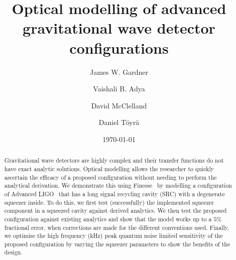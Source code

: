 \documentclass[aps,pra,superscriptaddress,reprint,nofootinbib]{revtex4-1}
\begin{document}
\title{Optical modelling of advanced gravitational wave detector configurations}

\author{James W. Gardner}

\author{Vaishali B. Adya}

\author{David McClelland}

\author{Daniel Töyrä}

\date{\today}


\begin{abstract}

Gravitational wave detectors are highly complex and their transfer functions do not have exact analytic solutions. Optical modelling allows the researcher to quickly ascertain the efficacy of a proposed configuration without needing to perform the analytical derivation. We demonstrate this using Finesse~\cite{finesse} by modelling a configuration of Advanced LIGO~\cite{AdvancedLIGO:2015} that has a long signal recycling cavity (SRC) with a degenerate squeezer inside. To do this, we first test (successfully) the implemented squeezer component in a squeezed cavity against derived analytics. We then test the proposed configuration against existing analytics and show that the model works up to a $5\%$ fractional error, when corrections are made for the different conventions used. Finally, we optimise the high frequency (kHz) peak quantum noise limited sensitivity of the proposed configuration by varying the squeezer parameters to show the benefits of the design.

\end{abstract}
\end{document}
